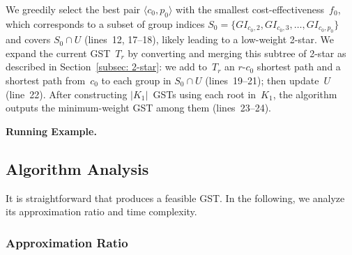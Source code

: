 \noindent We greedily select the best pair $\langle c_0,p_0 \rangle$ with the smallest cost-effectiveness~$f_0$, which corresponds to a subset of group indices $S_0=\{GI_{c_0,2},GI_{c_0,3},\dots,GI_{c_0,p_0}\}$ and covers $S_0 \cap U$ (lines~12, 17--18), likely leading to a low-weight 2-star. We expand the current GST~$T_r$ by converting and merging this subtree of 2-star as described in Section~\ref{subsec: 2-star}: we add to~$T_r$ an $r$-$c_0$ shortest path and a shortest path from~$c_0$ to each group in $S_0 \cap U$ (lines~19--21); then update~$U$ (line~22). After constructing $|K_1|$~GSTs using each root in~$K_1$, the algorithm outputs the minimum-weight GST among them (lines~23--24).

\textbf{Running Example.}

\subsection{Algorithm Analysis}
\label{subsec: basic analysis}
It is straightforward that \Basic produces a feasible GST. In the following, we analyze its approximation ratio and time complexity.

\subsubsection{Approximation Ratio}
\label{subsubsec: Appr_prove}


